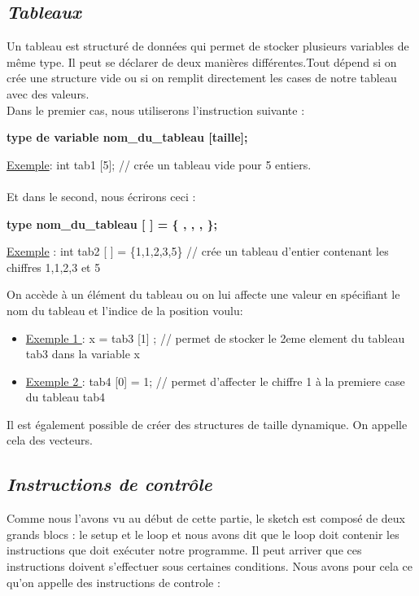 \documentclass[12pt,a4paper]{article}
\begin{document}
\subsection{\textit{\textbf{Tableaux}}}
Un tableau est structuré de données qui permet de stocker plusieurs variables de même type. Il peut se déclarer de deux manières différentes.Tout dépend si on crée une structure vide ou si on remplit directement les cases de notre tableau avec des valeurs. 
\\
Dans le premier cas, nous utiliserons l’instruction suivante :

\begin{center}
\textbf{type de variable nom\_du\_tableau [taille];}
\end{center}

\underline{Exemple}:  int tab1 [5]; // crée un tableau vide pour 5 entiers.
\\
\\
Et dans le second, nous écrirons ceci :

\begin{center}
\textbf{type nom\_du\_tableau [  \quad ] = \{  \quad , \quad   ,  \quad , \quad \};}
\end{center}

\underline{Exemple} : int tab2 [ \quad] = \{1,1,2,3,5\}  // crée un tableau d’entier contenant les chiffres 1,1,2,3 et 5

\bigskip
On accède à un élément du tableau ou on lui affecte une valeur en spécifiant le nom du tableau et l’indice de la position voulu:

\begin{itemize}
   \item[] \underline{Exemple 1 }:  x = tab3 [1] ; // permet de stocker le 2eme element du tableau tab3 dans la variable x


   \item[] \underline{Exemple 2 } : tab4 [0] = 1; // permet d’affecter le chiffre 1 à la premiere case du tableau tab4
\end{itemize}


\bigskip
Il est également possible de créer des structures de taille dynamique. On appelle cela des vecteurs.


\newpage
\subsection{\textit{\textbf{Instructions de contrôle}}}

\bigskip
Comme nous l’avons vu au début de cette partie, le sketch est composé de deux grands blocs : le setup et le loop et nous avons dit que le loop doit contenir les instructions que doit exécuter notre programme. Il peut arriver que ces instructions doivent s'effectuer sous certaines conditions. Nous avons pour cela ce qu’on appelle des instructions de controle :
\end{document}
